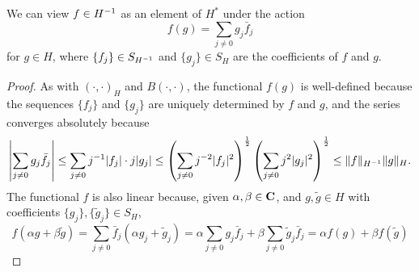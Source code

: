 \documentclass{homework}
\begin{document}
\begin{arabicparts}
		\questionpart
		We can view $f \in {H^{-1}}$ as an element of $H^*$ under the action
		\begin{equation}
			f(g) = \sum_{j\ne 0}g_j\bar{f}_j
		\end{equation}
		for $g \in H$, where $\{f_j\} \in S_{H^{-1}}$ and $\{g_j\} \in S_H$ are the coefficients of $f$ and $g$.
		\begin{proof}
			As with $(\cdot,\cdot)_H$ and $B(\cdot,\cdot)$, the functional $f(g)$ is well-defined because the sequences $\{f_j\}$ and $\{g_j\}$ are uniquely determined by $f$ and $g$, and the series converges absolutely because
			\begin{equation}
				\left|\sum_{j\ne 0}g_j\bar{f}_j\right| \le \sum_{j\ne 0}j^{-1}|f_j|\cdot j|g_j| \le \left(\sum_{j\ne0}j^{-2}|f_j|^2\right)^\frac{1}{2}\left(\sum_{j\ne0}j^2|g_j|^2\right)^\frac{1}{2} \le \lVert f\rVert_{H^{-1}}\lVert g\rVert_H.
			\end{equation}
			The functional $f$ is also linear because, given $\alpha,\beta \in \textbf{C}$, and $g, \tilde{g} \in H$ with coefficients $\{g_j\},\{\tilde{g}_j\}\in S_H$,
			\begin{equation}
				f(\alpha g+ \beta\tilde{g}) =\sum_{j\ne 0}\bar{f}_j(\alpha g_j + \tilde{g}_j) = \alpha \sum_{j\ne 0}g_j\bar{f}_j + \beta\sum_{j\ne0}\tilde{g}_j\bar{f}_j = \alpha f(g) + \beta f(\tilde{g})
			\end{equation}
		\end{proof}
	\end{arabicparts}
\end{document}
